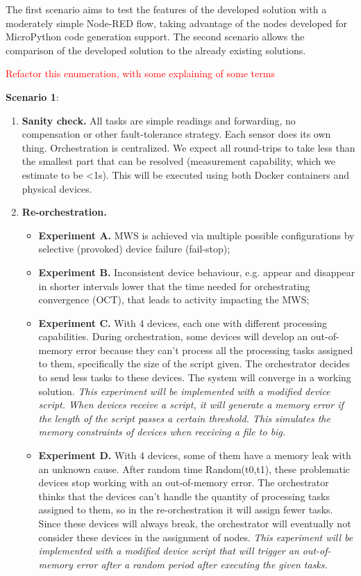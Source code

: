 The first scenario aims to test the features of the developed solution with a moderately simple Node-RED flow, taking advantage of the nodes developed for MicroPython code generation support. The second scenario allows the comparison of the developed solution to the already existing solutions.

\textcolor{red}{Refactor this enumeration, with some explaining of some terms}

\textbf{Scenario 1}:
\begin{enumerate}
    \item \textbf{Sanity check.} All tasks are simple readings and forwarding, no compensation or other fault-tolerance strategy. Each sensor does its own thing. Orchestration is centralized. We expect all round-trips to take less than the smallest part that can be resolved (measurement capability, which we estimate to be <1s). This will be executed using both Docker containers and physical devices.
    \item \textbf{Re-orchestration.}
        \begin{itemize}
            \item \textbf{Experiment A.} MWS is achieved via multiple possible configurations by selective (provoked) device failure (fail-stop);
            \item \textbf{Experiment B.} Inconsistent device behaviour, e.g. appear and disappear in shorter intervals lower that the time needed for orchestrating convergence (OCT), that leads to activity impacting the MWS;
            \item \textbf{Experiment C.} With 4 devices, each one with different processing capabilities. During orchestration, some devices will develop an out-of-memory error because they can't process all the processing tasks assigned to them, specifically the size of the script given. The orchestrator decides to send less tasks to these devices. The system will converge in a working solution. \textit{This experiment will be implemented with a modified device script. When devices receive a script, it will generate a memory error if the length of the script passes a certain threshold. This simulates the memory constraints of devices when receiving a file to big.}
            \item \textbf{Experiment D.} With 4 devices, some of them have a memory leak with an unknown cause. After random time Random(t0,t1), these problematic devices stop working with an out-of-memory error. The orchestrator thinks that the devices can't handle the quantity of processing tasks assigned to them, so in the re-orchestration it will assign fewer tasks. Since these devices will always break, the orchestrator will eventually not consider these devices in the assignment of nodes. \textit{This experiment will be implemented with a modified device script that will trigger an out-of-memory error after a random period after executing the given tasks.}

\end{itemize}
\end{enumerate}
